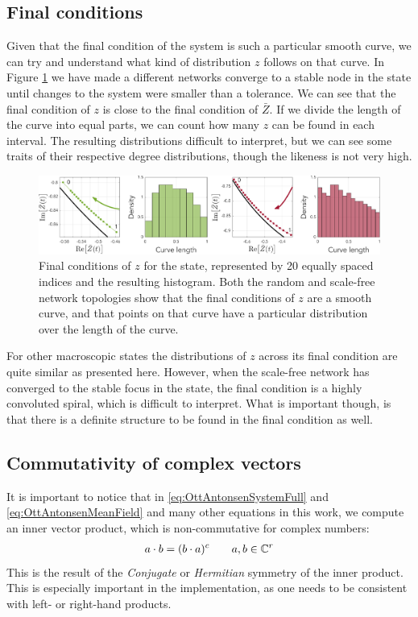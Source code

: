 \subsection{Final conditions}
Given that the final condition of the system is such a particular smooth curve, we can try and understand what kind of distribution $z$ follows on that curve. In Figure \ref{fig:FinalConditions} we have made a different networks converge to a stable node in the \PSR state until changes to the system were smaller than a tolerance. We can see that the final condition of $z$ is close to the final condition of $\bar{Z}$. If we divide the length of the curve into equal parts, we can count how many $z$ can be found in each interval. The resulting distributions difficult to interpret, but we can see some traits of their respective degree distributions, though the likeness is not very high. 
\begin{figure}[H]
\centering
\includegraphics[width = \textwidth]{../Figures/Distributions/FinalConditions.pdf}
\caption{Final conditions of $z$ for the \PSR state, represented by 20 equally spaced indices and the resulting histogram. Both the random and scale-free network topologies show that the final conditions of $z$ are a smooth curve, and that points on that curve have a particular distribution over the length of the curve.}
\label{fig:FinalConditions}
\end{figure}

For other macroscopic states the distributions of $z$ across its final condition are quite similar as presented here. However, when the scale-free network has converged to the stable focus in the \PSS state, the final condition is a highly convoluted spiral, which is difficult to interpret. What is important though, is that there is a definite structure to be found in the final condition as well.


\subsection{Commutativity of complex vectors} 
It is important to notice that in \eqref{eq:OttAntonsenSystemFull} and \eqref{eq:OttAntonsenMeanField} and many other equations in this work, we compute an inner vector product, which is non-commutative for complex numbers:
\begin{align}
a \cdot b = (b \cdot a)^c \qquad a, b \in {\mathbb{C}}^r
\end{align}
This is the result of the \textsl{Conjugate} or \textsl{Hermitian} symmetry of the inner product. This is especially important in the implementation, as one needs to be consistent with left- or right-hand products.


